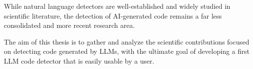While natural language detectors are well-established and widely 
studied in scientific literature, the detection of AI-generated code 
remains a far less consolidated and more recent research area. 

The aim of this thesis is to gather and analyze the scientific contributions 
focused on detecting code generated by LLMs, with the ultimate goal of developing 
a first LLM code detector that is easily usable by a user.







